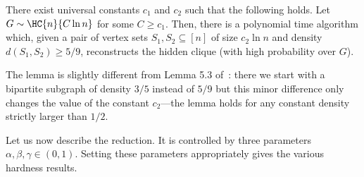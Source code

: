 \begin{lemma}[{\cite[Lemma 5.3]{HK11}}]
  \label{lemma:reconstruct}
  There exist universal constants $c_1$ and $c_2$ such that the
  following holds.  Let $G\sim\HC{n}{C\ln n}$ %
%
 for some $C \ge c_1$.  Then,
  there is a polynomial time algorithm which, given a pair
  of vertex sets $S_1,S_2 \subseteq [n]$ of size $c_2 \ln n$ and
  density $d(S_1,S_2)\geq5/9$, reconstructs the hidden clique (with
  high probability over $G$).
\end{lemma}

The lemma is slightly different from Lemma 5.3 of~\cite{HK11}: there
we start with a bipartite subgraph of density $3/5$ instead of $5/9$
but this minor difference only changes the value of the constant $c_2$---the lemma holds for any constant density strictly larger than
${1}/{2}$.

Let us now describe the reduction.  It is controlled by three
parameters $\alpha, \beta, \gamma \in (0,1)$.  Setting these parameters
  appropriately gives the various hardness results.


%
%
%

